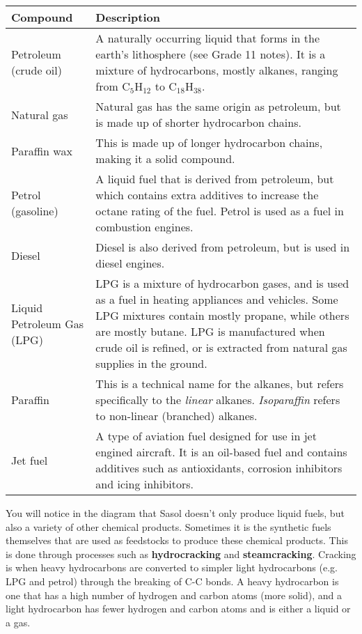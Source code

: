 \begin{enumerate}
{\begin{center}
\begin{tabular}{|p{2.5cm}|p{7.5cm}|}\hline
\textbf{Compound} & \textbf{Description} \\\hline
Petroleum (crude oil) & A naturally occurring liquid that forms in the earth's lithosphere (see Grade 11 notes). It is a mixture of hydrocarbons, mostly alkanes, ranging from C$_{5}$H$_{12}$ to C$_{18}$H$_{38}$. \\\hline
Natural gas & Natural gas has the same origin as petroleum, but is made up of shorter hydrocarbon chains.\\\hline
Paraffin wax & This is made up of longer hydrocarbon chains, making it a solid compound.\\\hline
Petrol (gasoline) & A liquid fuel that is derived from petroleum, but which contains extra additives to increase the octane rating of the fuel. Petrol is used as a fuel in combustion engines.\\\hline
Diesel & Diesel is also derived from petroleum, but is used in diesel engines.\\\hline
Liquid Petroleum Gas (LPG) & LPG is a mixture of hydrocarbon gases, and is used as a fuel in heating appliances and vehicles. Some LPG mixtures contain mostly propane, while others are mostly butane. LPG is manufactured when crude oil is refined, or is extracted from natural gas supplies in the ground.\\\hline
Paraffin & This is a technical name for the alkanes, but refers specifically to the \textit{linear} alkanes. \textit{Isoparaffin} refers to non-linear (branched) alkanes.\\\hline
Jet fuel & A type of aviation fuel designed for use in jet engined aircraft. It is an oil-based fuel and contains additives such as antioxidants, corrosion inhibitors and icing inhibitors.\\\hline
\end{tabular}
\end{center}
}

You will notice in the diagram that Sasol doesn't only produce liquid fuels, but also a variety of other chemical products. Sometimes it is the synthetic fuels themselves that are used as feedstocks to produce these chemical products. This is done through processes such as \textbf{hydrocracking} and \textbf{steamcracking}. Cracking is when heavy hydrocarbons are converted to simpler light hydrocarbons (e.g. LPG and petrol) through the breaking of C-C bonds. A heavy hydrocarbon is one that has a high number of hydrogen and carbon atoms (more solid), and a light hydrocarbon has fewer hydrogen and carbon atoms and is either a liquid or a gas.\\


\end{enumerate}
